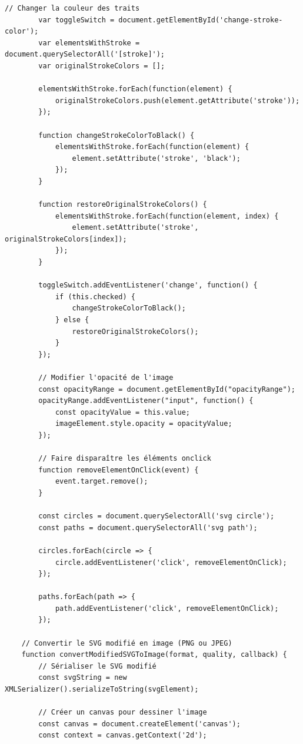 \begin{lstlisting}[language=HTML5, frame=single, breaklines=true, caption={\textit{Template} \html pour la manipulation des fichiers \svgs.}]
        // Changer la couleur des traits
        var toggleSwitch = document.getElementById('change-stroke-color');
        var elementsWithStroke = document.querySelectorAll('[stroke]');
        var originalStrokeColors = [];

        elementsWithStroke.forEach(function(element) {
            originalStrokeColors.push(element.getAttribute('stroke'));
        });

        function changeStrokeColorToBlack() {
            elementsWithStroke.forEach(function(element) {
                element.setAttribute('stroke', 'black');
            });
        }

        function restoreOriginalStrokeColors() {
            elementsWithStroke.forEach(function(element, index) {
                element.setAttribute('stroke', originalStrokeColors[index]);
            });
        }

        toggleSwitch.addEventListener('change', function() {
            if (this.checked) {
                changeStrokeColorToBlack();
            } else {
                restoreOriginalStrokeColors();
            }
        });

        // Modifier l'opacité de l'image
        const opacityRange = document.getElementById("opacityRange");
        opacityRange.addEventListener("input", function() {
            const opacityValue = this.value;
            imageElement.style.opacity = opacityValue;
        });

        // Faire disparaître les éléments onclick
        function removeElementOnClick(event) {
            event.target.remove();
        }

        const circles = document.querySelectorAll('svg circle');
        const paths = document.querySelectorAll('svg path');

        circles.forEach(circle => {
            circle.addEventListener('click', removeElementOnClick);
        });

        paths.forEach(path => {
            path.addEventListener('click', removeElementOnClick);
        });

    // Convertir le SVG modifié en image (PNG ou JPEG)
    function convertModifiedSVGToImage(format, quality, callback) {
        // Sérialiser le SVG modifié
        const svgString = new XMLSerializer().serializeToString(svgElement);

        // Créer un canvas pour dessiner l'image
        const canvas = document.createElement('canvas');
        const context = canvas.getContext('2d');


\end{lstlisting}
